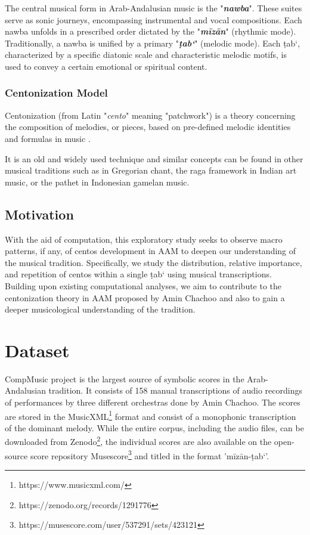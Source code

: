 \documentclass{article}
\begin{document}
The central musical form in Arab-Andalusian music is the "\textbf{\textit{nawba}}". These suites serve as sonic journeys, encompassing instrumental and vocal compositions. Each nawba unfolds in a prescribed order dictated by the "\textbf{\textit{mīzān}}" (rhythmic mode). Traditionally, a nawba is unified by a primary "\textbf{\textit{ṭab‘}}" (melodic mode). Each ṭab‘, characterized by a specific diatonic scale and characteristic melodic motifs, is used to convey a certain emotional or spiritual content.\cite{opencorpus}

\subsubsection{Centonization Model}

Centonization (from Latin "\textit{cento}" meaning "patchwork") is a theory concerning the composition of melodies, or pieces, based on pre-defined melodic identities and formulas in music \cite{10.1093/mq/LX.3.333}\cite{10.2307/830914}. 

It is an old and widely used technique \cite{ferretti1977estetica} and similar concepts can be found in other musical traditions such as in Gregorian chant, the raga framework in Indian art music, or the pathet in Indonesian gamelan music.

\subsection{Motivation}\label{sec:motivation}

 With the aid of computation, this exploratory study seeks to observe macro patterns, if any, of centos development in AAM to deepen our understanding of the musical tradition. Specifically, we study the distribution, relative importance, and repetition of centos within a single ṭab‘ using musical transcriptions. Building upon existing computational analyses, we aim to contribute to the centonization theory in AAM proposed by Amin Chachoo \cite{Chaachoo2011} and also to gain a deeper musicological understanding of the tradition.

\section{Dataset}\label{sec:dataset}

CompMusic project \cite{compmusic} is the largest source of symbolic scores in the Arab-Andalusian tradition. It consists of 158 manual transcriptions of audio recordings of performances by three different orchestras done by Amin Chachoo. The scores are stored in the MusicXML\footnote{https://www.musicxml.com/} format and consist of a monophonic transcription of the dominant melody. While the entire corpus, including the audio files, can be downloaded from Zenodo\footnote{https://zenodo.org/records/1291776}, the individual scores are also available on the open-source score repository Musescore\footnote{https://musescore.com/user/537291/sets/423121} and titled in the format 'mīzān-ṭab‘'.
\end{document}
